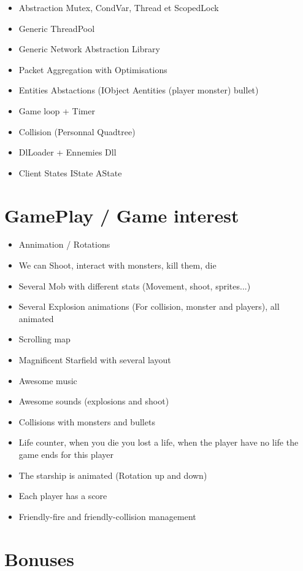 \documentclass{koala-fr}
\begin{document}
\begin{itemize}
  \item Abstraction Mutex, CondVar, Thread et ScopedLock
  \item Generic ThreadPool
  \item Generic Network Abstraction Library
  \item Packet Aggregation with Optimisations
  \item Entities Abstactions (IObject Aentities (player monster) bullet)
  \item Game loop + Timer
  \item Collision (Personnal Quadtree)
  \item DlLoader + Ennemies Dll
  \item Client States IState AState
\end{itemize}

\newpage

\section{GamePlay / Game interest}

\begin{itemize}
  \item Annimation / Rotations
  \item We can Shoot, interact with monsters, kill them, die
  \item Several Mob with different stats (Movement, shoot, sprites...)
  \item Several Explosion animations (For collision, monster and players), all animated
  \item Scrolling map
  \item Magnificent Starfield with several layout 
  \item Awesome music
  \item Awesome sounds (explosions and shoot)
  \item Collisions with monsters and bullets
  \item Life counter, when you die you lost a life, when the player have no life the game ends for this player
  \item The starship is animated (Rotation up and down)
  \item Each player has a score
  \item Friendly-fire and friendly-collision management
\end{itemize}

\newpage

\section{Bonuses}
\end{document}
